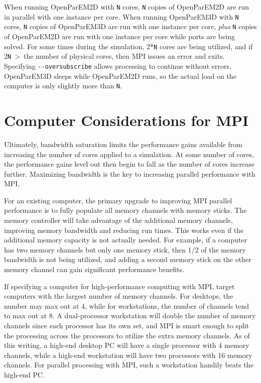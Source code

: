 \documentclass[titlepage]{article}
\renewcommand\_{\textunderscore\linebreak[1]}
\begin{document}
When running OpenParEM2D with \verb+N+ cores, \verb+N+ copies of OpenParEM2D are run in parallel with one instance per core.  When running OpenParEM3D with \verb+N+ cores, \verb+N+ copies of OpenParEM3D are run with one instance per core, \textit{plus} \verb+N+ copies of OpenParEM2D are run with one instance per core while ports are being solved.  For some times during the simulation, 2*\verb+N+ cores are being utilized, and if 2\verb+N+~\textgreater~the number of physical cores, then MPI issues an error and exits.  Specifying \verb+--oversubscribe+ allows processing to continue without errors.  OpenParEM3D sleeps while OpenParEM2D runs, so the actual load on the computer is only slightly more than \verb+N+.

\section{Computer Considerations for MPI}
\label{sec:computer}

Ultimately, bandwidth saturation limits the performance gains available from increasing the number of cores applied to a simulation.  At some number of cores, the performance gains level out then begin to fall as the number of cores increase further.  Maximizing bandwidth is the key to increasing parallel performance with MPI.

For an existing computer, the primary upgrade to improving MPI parallel performance is to fully populate all memory channels with memory sticks.  The memory controller will take advantage of the additional memory channels, improving memory bandwidth and reducing run times.  This works even if the additional memory capacity is not actually needed.  For example, if a computer has two memory channels but only one memory stick, then 1/2 of the memory bandwidth is not being utilized, and adding a second memory stick on the other memory channel can gain significant performance benefits.

If specifying a computer for high-performance computing with MPI, target computers with the largest number of memory channels.  For desktops, the number may max out at 4, while for workstations, the number of channels tend to max out at 8.  A dual-processor workstation will double the number of memory channels since each processor has its own set, and MPI is smart enough to split the processing across the processors to utilize the extra memory channels. As of this writing, a high-end desktop PC will have a single processor with 4 memory channels, while a high-end workstation will have two processors with 16 memory channels.  For parallel processing with MPI, such a workstation handily beats the high-end PC.
\end{document}

